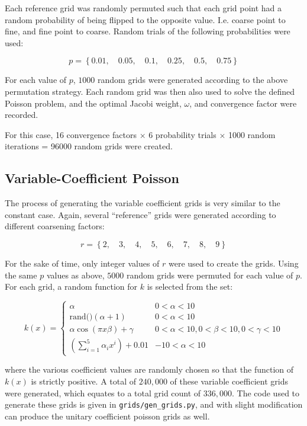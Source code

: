 Each reference grid was randomly permuted such that each grid point had a random probability of being flipped to the opposite value.  I.e. coarse point to fine, and fine point to coarse.  Random trials of the following probabilities were used:

$$ p = \left\{0.01, \quad 0.05, \quad 0.1, \quad 0.25, \quad 0.5, \quad 0.75\right\} $$

For each value of $p$, $1000$ random grids were generated according to the above permutation strategy.  Each random grid was then also used to solve the defined Poisson problem, and the optimal Jacobi weight, $\omega$, and convergence factor were recorded.

For this case, 16 convergence factors $\times$ 6 probability trials $\times$ 1000 random iterations = 96000 random grids were created.

\subsection{Variable-Coefficient Poisson}

The process of generating the variable coefficient grids is very similar to the constant case.  Again, several ``reference'' grids were generated according to different coarsening factors:

$$r = \left\{
2,\quad
3,\quad
4,\quad
5,\quad
6,\quad
7,\quad
8,\quad
9
\right\}$$

For the sake of time, only integer values of $r$ were used to create the grids.  Using the same $p$ values as above, $5000$ random grids were permuted for each value of $p$.  For each grid, a random function for $k$ is selected from the set:

$$
k\left(x\right) = \begin{cases}
\alpha & 0 < \alpha < 10 \\
\text{rand()}\left(\alpha + 1\right) & 0 < \alpha < 10 \\
\alpha\cos\left(\pi x \beta\right) + \gamma & 0 < \alpha < 10, 0 < \beta < 10, 0 < \gamma < 10\\
\left(\sum_{i=1}^5 \alpha_i x^i\right) + 0.01 & -10 < \alpha < 10 \end{cases}
$$

where the various coefficient values are randomly chosen so that the function of $k\left(x\right)$ is strictly positive.  A total of $240,000$ of these variable coefficient grids were generated, which equates to a total grid count of $336,000$.  The code used to generate these grids is given in \texttt{grids/gen\_grids.py}, and with slight modification can produce the unitary coefficient poisson grids as well.

